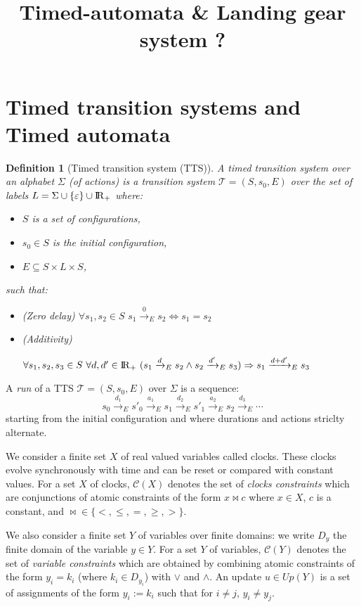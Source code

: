 \documentclass[a4paper,10pt]{article}
\title{Timed-automata \& Landing gear system ?}
\newtheorem{definition}{Definition}
\def\C{\ensuremath{\mathcal{C}}}
\def\T{\ensuremath{\mathcal{T}}}
\def\bbbr{{\rm I\!R }}
\begin{document}
\maketitle

\section{Timed transition systems and Timed automata}


\begin{definition}[Timed transition system (TTS)]
{\rm
A timed transition system over an alphabet $\Sigma$ (of actions) is a
transition system $\T=(S,s_0,E)$ over the set of labels $L = \Sigma
\cup \{ \varepsilon \} \cup \bbbr_{+}$ where:
\begin{itemize}
\item $S$ is a set of configurations,
\item $s_0 \in S$ is the initial configuration,
\item $E \subseteq S \times L \times S$,
\end{itemize}
such that:
\begin{itemize}
\item (Zero delay) $\forall s_1,s_2 \in S \, \, s_1 \xrightarrow{0}_{E} s_2
  \Leftrightarrow s_1=s_2$
\item (Additivity) 

$\forall s_1, s_2 ,s_3 \in S \, \, \forall d,d' \in
  \bbbr_{+} \, \, (s_1 \xrightarrow{d}_E s_2 \land s_2 \xrightarrow{d'}_E
  s_3) \Rightarrow s_1 \xrightarrow{d+d'}_E s_3$
\end{itemize}
}
\end{definition}
A \emph{run} of a TTS $\T=(S,s_0,E)$ over $\Sigma$ is a sequence:
\[
s_0 \xrightarrow{d_1}_E s'_0 \xrightarrow{a_1}_E s_1
\xrightarrow{d_2}_E s'_1 \xrightarrow{a_2}_E s_2 \xrightarrow{d_3}_E \cdots
\]
starting from the initial configuration and where durations and
actions striclty alternate.

We consider a finite set $X$  of real valued variables called
clocks. These clocks evolve synchronously with time and can be reset
or compared with constant values.
For a set $X$ of clocks, $\C(X)$ denotes the set of \emph{clocks constraints}
which are conjunctions of atomic constraints of the form $x \bowtie c$
where $x \in X$, $c$ is a constant, and $\bowtie \in \{ <,\le,= , \geq,>
\}$.

We also consider a finite set $Y$ of variables over finite domains: we
write $D_y$ the finite domain of the variable $y \in Y$. 
For a set $Y$ of variables,
$\C(Y)$ denotes the set of \emph{variable constraints}
which are 
obtained by combining atomic constraints of the form $y_i = k_i$ (where
$k_i \in D_{y_i}$) with
$\lor$ and $\land$.
An update $u \in Up(Y)$ is a set of assignments of the form $y_i :=
k_i$ such that for $i \neq j$, $y_i \neq y_j$.
\end{document}
